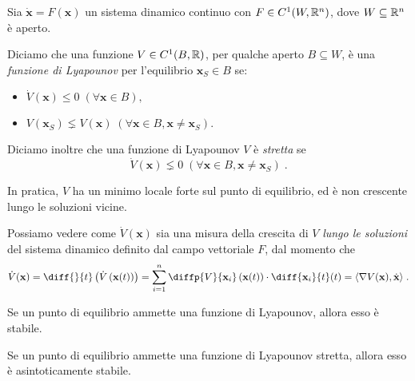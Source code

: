 \begin{definizione}
    Sia $\dot{\mathbf{x}} = F(\mathbf{x})$ un sistema dinamico continuo con $F \in C^1(W,\mathbb{R}^n)$, dove
    $W \subseteq \mathbb{R}^n$ è aperto.

    Diciamo che una funzione $V \in C^1(B, \mathbb{R})$, per qualche aperto $B \subseteq W$, è una
    \emph{funzione di Lyapounov} per l'equilibrio $\mathbf{x}_S \in B$ se:
    \begin{itemize}
        \item $\dot{V} ( \mathbf{x} ) \leq 0 \; (\forall \mathbf{x} \in B),$
        \item $V( \mathbf{x}_S ) \lneq V( \mathbf{x} ) \; (\forall \mathbf{x} \in B, \mathbf{x} \neq \mathbf{x}_S).$
    \end{itemize}

    Diciamo inoltre che una funzione di Lyapounov $V$ è \emph{stretta} se
    $$\dot{V}(\mathbf{x}) \lneq 0 \; (\forall \mathbf{x} \in B, \mathbf{x} \neq \mathbf{x}_S) \; .$$
\end{definizione}

In pratica, $V$ ha un minimo locale forte sul punto di equilibrio, ed è non crescente
lungo le soluzioni vicine.

Possiamo vedere come $\dot{V} ( \mathbf{x} )$ sia una misura della crescita
di $V$ \emph{lungo le soluzioni} del sistema
dinamico definito dal campo vettoriale $F$, dal momento che
$$\dot{V} ( \mathbf{x} ) = \diff{}{t} \left( \dot{V} \left( \mathbf{x} (t) \right) \right) =
\sum_{i=1}^n \diffp{V}{{\mathbf{x}_i}} \left( \mathbf{x} (t) \right) \cdot \diff{ \mathbf{x}_i }{t} (t) =
\langle \nabla V ( \mathbf{x} ) , \dot{ \mathbf{x} } \rangle \; .$$

\begin{teorema}
    Se un punto di equilibrio ammette una funzione di Lyapounov, allora esso è stabile.
    \label{teo:lyapounovFunc}
\end{teorema}

\begin{corollario}
    Se un punto di equilibrio ammette una funzione di Lyapounov stretta, allora esso è asintoticamente stabile.
\end{corollario}
